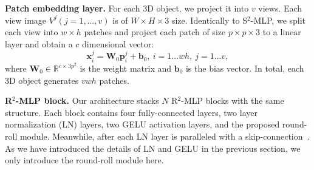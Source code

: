 \documentclass[11pt]{article}
\begin{document}
\vspace{0.2in}\noindent\textbf{Patch embedding layer.}
For each 3D object, we project it into $v$ views. Each view image $V^j (j=1, \dots, v)$ is of $W \times H \times 3$ size. Identically to S$^2$-MLP, we split each view into $w \times h$ patches and project each patch of size $p \times p \times 3$ to a linear layer and obtain a $c$ dimensional vector:
\begin{equation}
    \bm{x}_i^j = \bm{W}_0 \bm{p}_i^j + \bm{b}_0, ~i = 1 \dots wh,~ j = 1 \dots v,
\end{equation}
where $\bm{W}_0 \in \mathbb{R}^{c \times 3p^2}$ is the weight matrix and $\bm{b}_0$ is the bias vector.
In total, each 3D object generates $vwh$ patches.

\vspace{0.2in}\noindent\textbf{R\texorpdfstring{$^2$}{\texttwosuperior}-MLP block.}
Our architecture stacks $N$  R$^2$-MLP blocks with the same structure. Each block contains four fully-connected layers, two layer normalization (LN) layers, two GELU activation layers, and the proposed round-roll module. Meanwhile, after each LN layer is paralleled with a skip-connection~\citep{he2016deep}. As we have introduced the details of LN and GELU in the previous section,  we only introduce the round-roll module here.
\end{document}
